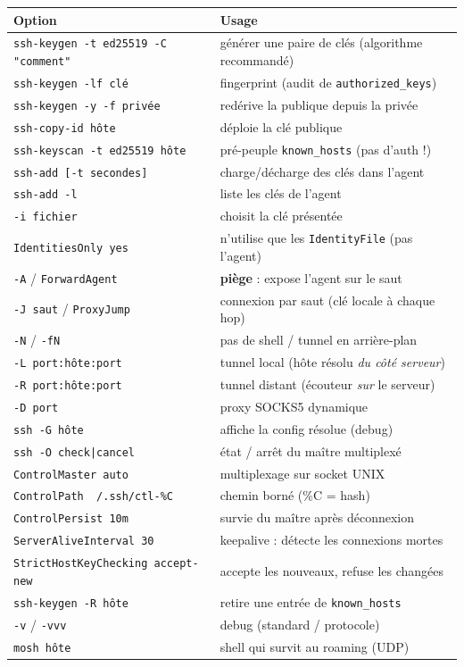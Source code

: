 \documentclass[a4paper,10pt]{exam}
\begin{document}
\begin{center}
\small
\begin{tabular}{p{} p{}}
\hline
\textbf{Option} & \textbf{Usage} \\
\hline
\texttt{ssh-keygen -t ed25519 -C "comment"} & générer une paire de clés (algorithme recommandé) \\
\texttt{ssh-keygen -lf clé} & fingerprint (audit de \texttt{authorized\_keys}) \\
\texttt{ssh-keygen -y -f privée} & redérive la publique depuis la privée \\
\texttt{ssh-copy-id hôte} & déploie la clé publique \\
\texttt{ssh-keyscan -t ed25519 hôte} & pré-peuple \texttt{known\_hosts} (pas d'auth !) \\
\texttt{ssh-add [-t secondes]} & charge/décharge des clés dans l'agent \\
\texttt{ssh-add -l} & liste les clés de l'agent \\
\texttt{-i fichier} & choisit la clé présentée \\
\texttt{IdentitiesOnly yes} & n'utilise que les \texttt{IdentityFile} (pas l'agent) \\
\texttt{-A} / \texttt{ForwardAgent} & \textbf{piège} : expose l'agent sur le saut \\
\texttt{-J saut} / \texttt{ProxyJump} & connexion par saut (clé locale à chaque hop) \\
\texttt{-N} / \texttt{-fN} & pas de shell / tunnel en arrière-plan \\
\texttt{-L port:hôte:port} & tunnel local (hôte résolu \emph{du côté serveur}) \\
\texttt{-R port:hôte:port} & tunnel distant (écouteur \emph{sur} le serveur) \\
\texttt{-D port} & proxy SOCKS5 dynamique \\
\texttt{ssh -G hôte} & affiche la config résolue (debug) \\
\texttt{ssh -O check|cancel} & état / arrêt du maître multiplexé \\
\texttt{ControlMaster auto} & multiplexage sur socket UNIX \\
\texttt{ControlPath ~/.ssh/ctl-\%C} & chemin borné (\%C = hash) \\
\texttt{ControlPersist 10m} & survie du maître après déconnexion \\
\texttt{ServerAliveInterval 30} & keepalive : détecte les connexions mortes \\
\texttt{StrictHostKeyChecking accept-new} & accepte les nouveaux, refuse les changées \\
\texttt{ssh-keygen -R hôte} & retire une entrée de \texttt{known\_hosts} \\
\texttt{-v} / \texttt{-vvv} & debug (standard / protocole) \\
\texttt{mosh hôte} & shell qui survit au roaming (UDP) \\
\hline
\end{tabular}
\end{center}
\end{document}
